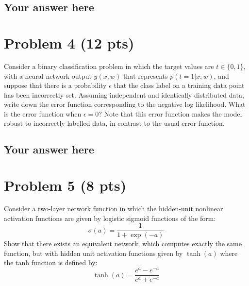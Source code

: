 \documentclass{article}
\begin{document}
\subsection*{Your answer here}


\section*{Problem 4 (12 pts)}
Consider a binary classification problem in which the target 
values are $t \in  \{0, 1\}$, with a neural 
network output $y(x, w)$ that represents $p(t = 1|x; w)$, and suppose that there is
 a probability $\epsilon$  that the class label on a training data point has been incorrectly set. 
Assuming independent and identically distributed data, write down the error function corresponding to the negative log likelihood. 
What is the error function when $\epsilon=0$? 
Note that this error function makes the model robust to incorrectly labelled data, in contrast to the usual error function.

\subsection*{Your answer here}


\section*{Problem 5 (8 pts)}
Consider a two-layer network function in which the hidden-unit nonlinear activation functions are given by logistic sigmoid functions of the
form:
\begin{equation}
\sigma(a) = \frac{1}{1 + \exp(-a)}
\end{equation}
Show that there exists an equivalent network, which computes exactly the same 
function, but with hidden unit activation functions 
given by $\tanh(a)$ where the tanh function is defined by:
\begin{equation}
\tanh(a) = \frac{e^a - e^{-a}}{e^a + e^{-a}}
\end{equation}
\end{document}
